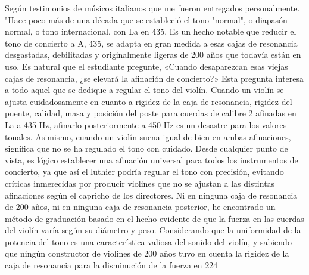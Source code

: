 Según testimonios de músicos italianos que me fueron entregados personalmente. "Hace poco más de una década que se estableció el tono "normal", o diapasón normal, o tono internacional, con La en 435.
Es un hecho notable que reducir el tono de concierto a A, 435, se adapta en gran medida a esas cajas de resonancia desgastadas, debilitadas y originalmente ligeras de 200 años que todavía están en uso. Es natural que el estudiante pregunte,
«Cuando desaparezcan esas viejas cajas de resonancia, ¿se elevará la afinación de concierto?» Esta pregunta interesa a todo aquel que se dedique a regular el tono del violín.
Cuando un violín se ajusta cuidadosamente en cuanto a rigidez de la caja de resonancia, rigidez del puente, calidad, masa y posición del poste para cuerdas de calibre 2 afinadas en La a 435 Hz, afinarlo posteriormente a 450 Hz es un desastre para los valores tonales. Asimismo, cuando un violín suena igual de bien en ambas afinaciones, significa que no se ha regulado el tono con cuidado. Desde cualquier punto de vista, es lógico establecer una afinación universal para todos los instrumentos de concierto, ya que así el luthier podría regular el tono con precisión, evitando críticas inmerecidas por producir violines que no se ajustan a las distintas afinaciones según el capricho de los directores.
Ni en ninguna caja de resonancia de 200 años, ni en ninguna caja de resonancia posterior, he encontrado un método de graduación basado en el hecho evidente de que la fuerza en las cuerdas del violín varía según su diámetro y peso. Considerando que la uniformidad de la potencia del tono es una característica valiosa del sonido del violín, y sabiendo que ningún constructor de violines de 200 años tuvo en cuenta la rigidez de la caja de resonancia para la disminución de la fuerza en
224

